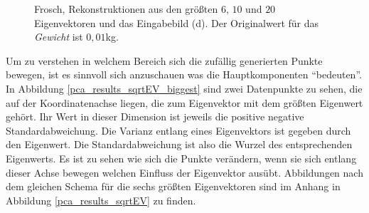 \begin{figure}[H]
  \caption{Frosch, Rekonstruktionen aus den größten $6$, $10$ und $20$ Eigenvektoren und das Eingabebild (d). Der Originalwert für das \emph{Gewicht} ist $0,01$kg.}
  \label{frosch}
 \end{figure}
 
 
 Um zu verstehen in welchem Bereich sich die zufällig generierten Punkte bewegen, ist es sinnvoll sich anzuschauen was die Hauptkomponenten "`bedeuten"'. In Abbildung \ref{pca_results_sqrtEV_biggest} sind zwei Datenpunkte zu sehen, die auf der Koordinatenachse liegen, die zum Eigenvektor mit dem größten Eigenwert gehört. Ihr Wert in dieser Dimension ist jeweils die positive \bzw negative Standardabweichung. Die Varianz entlang eines Eigenvektors ist gegeben durch den Eigenwert. Die Standardabweichung ist also die Wurzel des entsprechenden Eigenwerts. Es ist zu sehen wie sich die Punkte verändern, wenn sie sich entlang dieser Achse bewegen \bzw welchen Einfluss der Eigenvektor ausübt. Abbildungen nach dem gleichen Schema für die sechs größten Eigenvektoren sind im Anhang in Abbildung \ref{pca_results_sqrtEV} zu finden.
 
